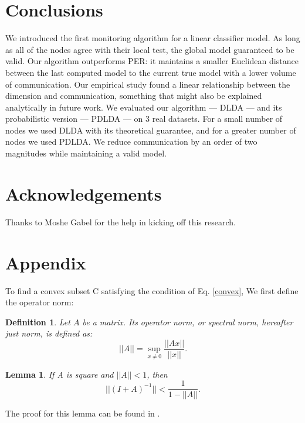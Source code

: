 \documentclass{sig-alternate-05-2015}
\newtheorem{lemma}{Lemma}
\newtheorem{definition}{Definition}
\begin{document}
\section*{Conclusions}
We introduced the first monitoring algorithm for a linear classifier model.
As long as all of the nodes agree with their local test, the
global model guaranteed to be valid. 
Our algorithm outperforms PER: it maintains a smaller Euclidean distance between 
the last computed model to the current true model with a lower volume of
communication. 
Our empirical study found a linear relationship between the dimension and
communication, something that might also be explained analytically 
in future work. 
We evaluated our algorithm --- DLDA --- and its probabilistic version --- PDLDA --- on 3 real datasets. For a small number of nodes we used 
DLDA with its theoretical guarantee, and for a greater number of nodes we used
PDLDA.
We reduce communication by an order of two magnitudes while maintaining a 
valid model.
 \section*{Acknowledgements}
Thanks to Moshe Gabel for the help in kicking off this research.

%

%
%

\appendix
\section{Appendix} \label{AppendixA}
To find a convex subset C satisfying the condition of Eq. \ref{convex},
We first define the operator norm:
\begin{definition}
Let $A$ be a matrix. Its operator norm, or
spectral norm, hereafter just norm, is defined as:
\begin{equation*}
||A|| = \sup_{x \neq 0}\frac{||Ax||}{||x||}.
\end{equation*}
\end{definition}

\begin{lemma} \label{lemma:newman}
If A is square and $||A|| < 1$, then
\begin{equation*}
||(I+A)^{-1}|| < \frac{1}{1-||A||}.
\end{equation*}
\end{lemma}
The proof for this lemma can be found in \cite{gabel2015monitoring}.
\end{document}

